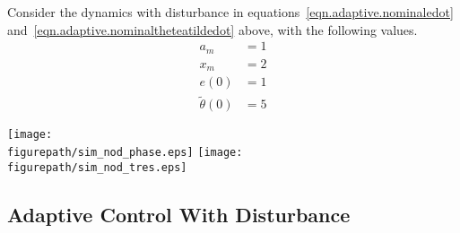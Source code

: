 \begin{example}
  Consider the dynamics with disturbance in equations~\eqref{eqn.adaptive.nominaledot} and~\eqref{eqn.adaptive.nominaltheteatildedot} above, with the following values.
  \begin{align*}
    a_{m}&=1 \\
    x_{m}&=2 \\
    e(0)&=1 \\
    \tilde{\theta}(0)&=5
  \end{align*}
  \begin{center}
    \texttt{[image: \\figurepath/sim\_nod\_phase.eps]}
    \texttt{[image: \\figurepath/sim\_nod\_tres.eps]}
  \end{center}
\end{example}

\subsection{Adaptive Control With Disturbance}

